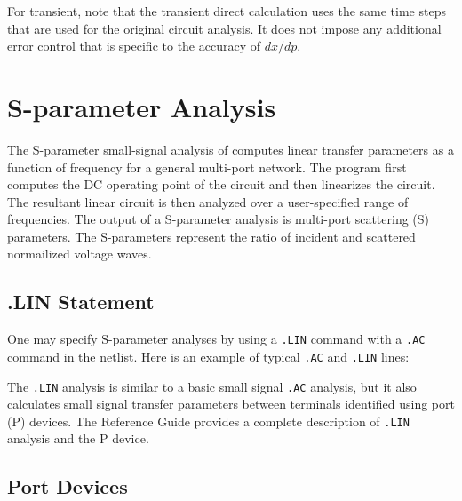 For transient, note that the transient direct calculation uses the same time steps 
that are used for the original circuit analysis.  It does not impose any additional error
control that is specific to the accuracy of $dx/dp$.


\section{S-parameter Analysis}
\label{SP_Analysis}
\label{SP_Sweep_Overview}
  
 

The S-parameter small-signal analysis of \Xyce{} computes linear transfer parameters as a
function of frequency for a general multi-port network. The program first computes the DC operating point of 
the circuit and then linearizes the circuit. The resultant linear circuit is then
analyzed over a user-specified range of frequencies. The output of a S-parameter
analysis is multi-port scattering (S) parameters. The S-parameters represent
the ratio of incident and scattered normailized voltage waves.

\subsection{.LIN Statement}

One may specify S-parameter analyses by using a \verb|.LIN| command with a \verb|.AC| command in the netlist.
Here is an example of typical \verb|.AC| and \verb|.LIN| lines:


The \verb|.LIN| analysis is similar to a basic small signal \verb|.AC| analysis, but it also calculates small signal 
transfer parameters between terminals identified using port (P) devices. The \Xyce{} Reference Guide\ReferenceGuide{} 
provides a complete description of \verb|.LIN| analysis and the P device.

\subsection{Port Devices}
\label{SP_Port}

